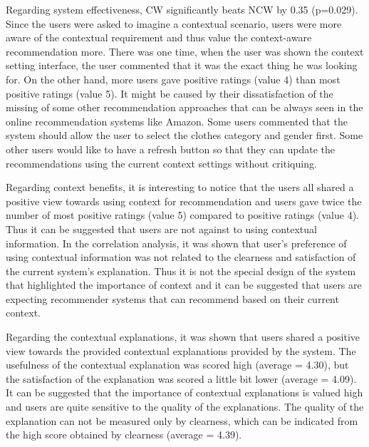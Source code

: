 Regarding system effectiveness, CW significantly beats NCW by 0.35 (p=0.029). Since the users were asked to imagine a contextual scenario, users were more aware of the contextual requirement and thus value the context-aware recommendation more. There was one time, when the user was shown the context setting interface, the user commented that it was the exact thing he was looking for. On the other hand, more users gave positive ratings (value 4) than most positive ratings (value 5). It might be caused by their dissatisfaction of the missing of some other recommendation approaches that can be always seen in the online recommendation systems like Amazon. Some users commented that the system should allow the user to select the clothes category and gender first. Some other users would like to have a refresh button so that they can update the recommendations using the current context settings without critiquing.

Regarding context benefits, it is interesting to notice that the users all shared a positive view towards using context for recommendation and users gave twice the number of most positive ratings (value 5) compared to positive ratings (value 4). Thus it can be suggested that users are not against to using contextual information. In the correlation analysis, it was shown that user's preference of using contextual information was not related to the clearness and satisfaction of the current system's explanation. Thus it is not the special design of the system that highlighted the importance of context and it can be suggested that users are expecting recommender systems that can recommend based on their current context. 

Regarding the contextual explanations, it was shown that users shared a positive view towards the provided contextual explanations provided by the system. The usefulness of the contextual explanation was scored high (average = 4.30), but the satisfaction of the explanation was scored a little bit lower (average = 4.09). It can be suggested that the importance of contextual explanations is valued high and users are quite sensitive to the quality of the explanations. The quality of the explanation can not be measured only by clearness, which can be indicated from the high score obtained by clearness (average = 4.39). 

